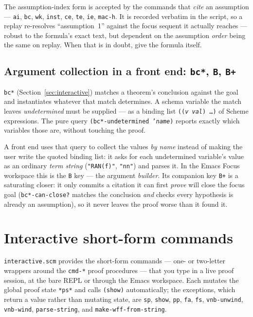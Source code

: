 \begin{remark}
The assumption-index form is accepted by the commands that \emph{cite} an
assumption --- \texttt{ai}, \texttt{bc}, \texttt{wk}, \texttt{inst},
\texttt{ce}, \texttt{te}, \texttt{ie}, \texttt{mac-h}.  It is recorded
verbatim in the script, so a replay re-resolves ``assumption~1'' against
the focus sequent it actually reaches --- robust to the formula's exact
text, but dependent on the assumption \emph{order} being the same on
replay.  When that is in doubt, give the formula itself.
\end{remark}

\subsection{Argument collection in a front end: \texttt{bc*}, \texttt{B}, \texttt{B+}}
\label{sec:bc-star-collection}

\texttt{bc*} (Section~\ref{sec:interactive}) matches a theorem's conclusion
against the goal and instantiates whatever that match determines.  A schema
variable the match leaves \emph{undetermined} must be supplied --- as a
binding list \texttt{((\textit{v}\ \textit{val})\ \ldots)} of Scheme
expressions.  The pure query \texttt{(bc*-undetermined '\textit{name})}
reports exactly which variables those are, without touching the proof.

A front end uses that query to collect the values \emph{by name} instead of
making the user write the quoted binding list: it asks for each undetermined
variable's value as an ordinary \emph{term string} (\texttt{"RAN(f)"},
\texttt{"nn"}) and parses it.  In the Emacs Focus workspace this is the
\texttt{B} key --- the argument \emph{builder}.  Its companion key
\texttt{B+} is a saturating closer: it only commits a citation it
can first \emph{prove} will close the focus goal
(\texttt{bc*-can-close?} matches the conclusion \emph{and} checks every
hypothesis is already an assumption), so it never leaves the proof worse
than it found it.

\section{Interactive short-form commands}\label{sec:tactics-ref}
\label{sec:interactive}

\texttt{interactive.scm} provides the short-form commands --- one- or two-letter
wrappers around the \texttt{cmd-*} proof procedures --- that you type in a live
proof session, at the bare REPL or through the Emacs workspace.  Each mutates the
global proof state \texttt{*ps*} and calls \texttt{(show)} automatically; the
exceptions, which return a value rather than mutating state, are \texttt{sp},
\texttt{show}, \texttt{pp}, \texttt{fa}, \texttt{fs}, \texttt{vnb-unwind},
\texttt{vnb-wind}, \texttt{parse-string}, and \texttt{make-wff-from-string}.

